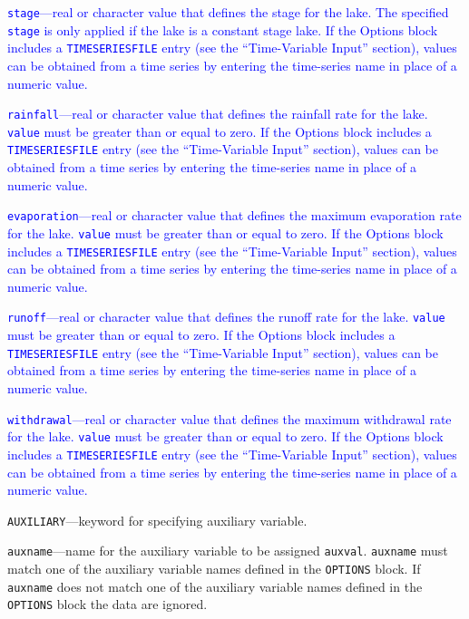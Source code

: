 \begin{description}
\item \textcolor{blue}{\texttt{stage}---real or character value that defines the stage for the lake. The specified \texttt{stage} is only applied if the lake is a constant stage lake. If the Options block includes a \texttt{TIMESERIESFILE} entry (see the ``Time-Variable Input'' section), values can be obtained from a time series by entering the time-series name in place of a numeric value.}

\item \textcolor{blue}{\texttt{rainfall}---real or character value that defines the rainfall rate for the lake. \texttt{value} must be greater than or equal to zero. If the Options block includes a \texttt{TIMESERIESFILE} entry (see the ``Time-Variable Input'' section), values can be obtained from a time series by entering the time-series name in place of a numeric value.}

\item \textcolor{blue}{\texttt{evaporation}---real or character value that defines the maximum evaporation rate for the lake. \texttt{value} must be greater than or equal to zero. If the Options block includes a \texttt{TIMESERIESFILE} entry (see the ``Time-Variable Input'' section), values can be obtained from a time series by entering the time-series name in place of a numeric value.}

\item \textcolor{blue}{\texttt{runoff}---real or character value that defines the runoff rate for the lake. \texttt{value} must be greater than or equal to zero. If the Options block includes a \texttt{TIMESERIESFILE} entry (see the ``Time-Variable Input'' section), values can be obtained from a time series by entering the time-series name in place of a numeric value.}

\item \textcolor{blue}{\texttt{withdrawal}---real or character value that defines the maximum withdrawal rate for the lake. \texttt{value} must be greater than or equal to zero. If the Options block includes a \texttt{TIMESERIESFILE} entry (see the ``Time-Variable Input'' section), values can be obtained from a time series by entering the time-series name in place of a numeric value.}

\item \texttt{AUXILIARY}---keyword for specifying auxiliary variable.

\item \texttt{auxname}---name for the auxiliary variable to be assigned \texttt{auxval}.  \texttt{auxname} must match one of the auxiliary variable names defined in the \texttt{OPTIONS} block. If \texttt{auxname} does not match one of the auxiliary variable names defined in the \texttt{OPTIONS} block the data are ignored.


\end{description}
